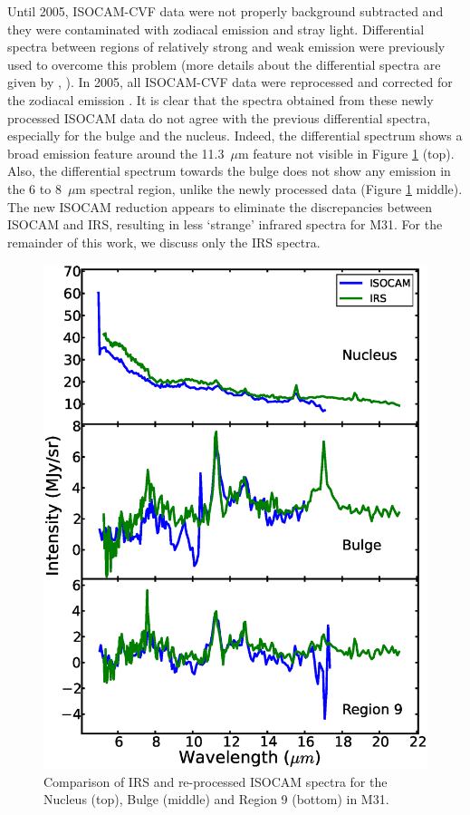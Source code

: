 Until 2005, ISOCAM-CVF data were not properly background subtracted and they were contaminated with zodiacal emission and stray light. 
Differential spectra between regions of relatively strong and weak emission were previously used to overcome this problem 
(more details about the differential spectra are given by \citealt{1998Cesarsky}, \citealt{Pagani_1999}). In 2005, all ISOCAM-CVF data were reprocessed 
and corrected for the zodiacal emission \citep{Boulanger_F_2005}. It is clear that the spectra obtained from these newly processed ISOCAM data 
do not agree with the previous differential spectra, especially for the bulge and the nucleus. Indeed, the differential spectrum shows a broad emission feature
around the 11.3~$\mu$m feature not visible in Figure \ref{ISOnIRS} (top). Also, the differential spectrum towards the bulge does not show 
any emission in the 6 to 8~$\mu$m spectral region, unlike the newly processed data (Figure \ref{ISOnIRS} middle).
The new ISOCAM reduction appears to eliminate the discrepancies between ISOCAM and IRS, resulting
in less `strange' infrared spectra for M31. For the remainder of this work, we discuss only the IRS spectra.


\begin{figure}
\centering
\includegraphics[scale=0.35]{./ISOvsIRS.eps}
\caption{ Comparison of  IRS and re-processed ISOCAM spectra for the Nucleus (top), Bulge (middle) and Region 9 (bottom) in M31.}
\label{ISOnIRS}
\end{figure}



